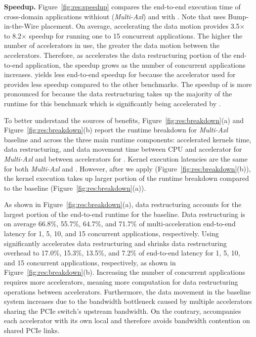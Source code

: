 \noindent \textbf{Speedup.}
%
Figure~\ref{fig:res:speedup} compares the end-to-end execution time of cross-domain applications withiout (\emph{Multi-Axl}) and with \dmx. Note that \dmx uses Bump-in-the-Wire \drx placement. 
%
On average, accelerating the data motion provides 3.5$\times$ to 8.2$\times$ speedup for running one to 15 concurrent applications.
%
The higher the number of accelerators in use, the greater the data motion between the accelerators. %
%
Therefore, as \drx accelerates the data restructuring portion of the end-to-end application, the speedup grows as the number of concurrent applications increases.
%
\dmx yields less end-to-end speedup for \vs because the accelerator used for \vs provides less speedup compared to the other benchmarks. 
%
The speedup of \dmx is more pronounced for \dhj because the data restructuring takes up the majority of the runtime for this benchmark which is significantly being accelerated by \drx. 
%

To better understand the sources of benefits, Figure~\ref{fig:res:breakdown}(a) and Figure~\ref{fig:res:breakdown}(b) report the runtime breakdown for \emph{Multi-Axl} baseline and \dmx across the three main runtime components: accelerated kernels time, data restructuring, and data movement time between CPU and accelerator for \emph{Multi-Axl} and between accelerators for \dmx.
%
Kernel execution latencies are the same for both \emph{Multi-Axl} and \dmx.
%
However, after we apply \dmx (Figure~\ref{fig:res:breakdown}(b)), the kernel execution takes up larger portion of the runtime breakdown compared to the baseline (Figure~\ref{fig:res:breakdown}(a)).
%

As shown in Figure~\ref{fig:res:breakdown}(a), 
data restructuring accounts for the largest portion of the end-to-end runtime for the baseline.
%
Data restructuring is on average 66.8\%, 55.7\%, 64.7\%, and 71.7\% of multi-acceleration end-to-end latency for 1, 5, 10, and 15 concurrent applications, respectively.  
%
Using \drx significantly accelerates data restructuring and shrinks data restructuring overhead to 17.0\%, 15.3\%, 13.5\%, and 7.2\% of \dmx end-to-end latency for 1, 5, 10, and 15 concurrent applications, respectively, as shown in Figure~\ref{fig:res:breakdown}(b).
%
Increasing the number of concurrent applications requires more accelerators, meaning more computation for data restructuring operations between accelerators.
%
Furthermore, the data movement in the baseline system increases due to the bandwidth bottleneck caused by multiple accelerators sharing the PCIe switch's upstream bandwidth. %
%
On the contrary, \dmx accompanies each accelerator with its own local \drx and therefore avoids bandwidth contention on shared PCIe links.

